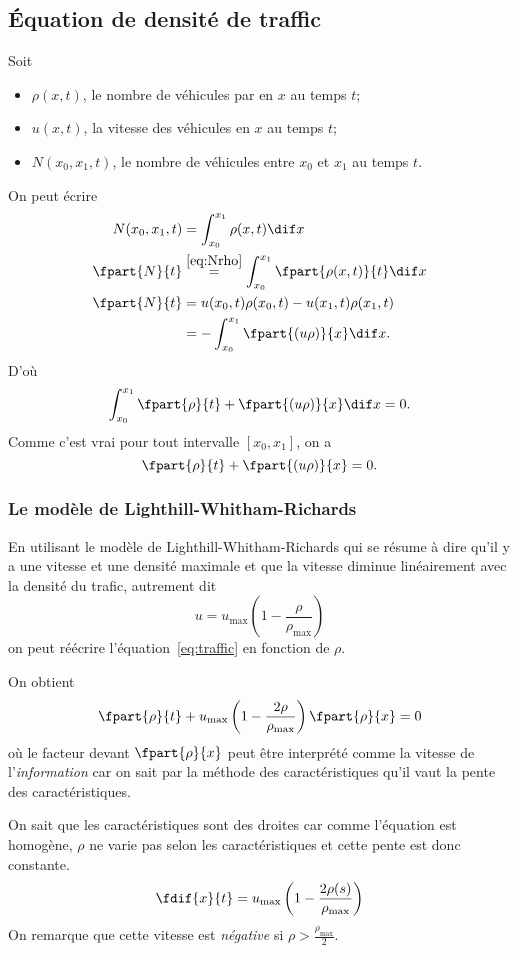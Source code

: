 \subsection{Équation de densité de traffic}
\label{sec:traffic}
Soit
\begin{itemize}
  \item $\rho(x, t)$, le nombre de véhicules par \meter en $x$ au temps $t$;
  \item $u(x, t)$, la vitesse des véhicules en $x$ au temps $t$;
  \item $N(x_0, x_1, t)$, le nombre de véhicules entre $x_0$ et $x_1$
    au temps $t$.
\end{itemize}
On peut écrire
\begin{align}
  \label{eq:Nrho}
  N(x_0, x_1, t) & = \int_{x_0}^{x_1} \rho(x, t) \dif x\\
  \nonumber
  \fpart{N}{t} & \stackrel{\eqref{eq:Nrho}}{=}
  \int_{x_0}^{x_1} \fpart{\rho(x, t)}{t} \dif x\\
  \nonumber
  \fpart{N}{t} & = u(x_0, t) \rho(x_0, t) - u(x_1, t) \rho(x_1, t)\\
  \nonumber
  & = - \int_{x_0}^{x_1} \fpart{(u\rho)}{x} \dif x.
\end{align}
D'où
\[ \int_{x_0}^{x_1} \fpart{\rho}{t} + \fpart{(u\rho)}{x} \dif x = 0. \]
Comme c'est vrai pour tout intervalle $[x_0, x_1]$, on a
\begin{equation}
  \label{eq:traffic}
  \fpart{\rho}{t} + \fpart{(u\rho)}{x} = 0.
\end{equation}

\subsubsection{Le modèle de Lighthill-Whitham-Richards}
En utilisant le modèle de Lighthill-Whitham-Richards qui
se résume à dire qu'il y a une vitesse et une densité maximale
et que la vitesse diminue linéairement avec la densité du trafic,
autrement dit
\[ u = u_\mathrm{max} \left(1 - \frac{\rho}{\rho_\mathrm{max}}\right) \]
on peut réécrire l'équation~\eqref{eq:traffic} en fonction de $\rho$.

On obtient
\[ \fpart{\rho}{t} + u_\mathrm{max}
\left(1 - \frac{2\rho}{\rho_\mathrm{max}}\right)\fpart{\rho}{x} = 0 \]
où le facteur devant $\fpart{\rho}{x}$ peut être interprété comme la vitesse
de l'\emph{information} car on sait par la méthode des caractéristiques
qu'il vaut la pente des caractéristiques.

On sait que les caractéristiques sont des droites car comme l'équation
est homogène, $\rho$ ne varie pas selon les caractéristiques et cette
pente est donc constante.
\[ \fdif{x}{t} =
u_\mathrm{max} \left(1-\frac{2\rho(s)}{\rho_\mathrm{max}}\right) \]
On remarque que cette vitesse est \emph{négative} si
$\rho > \frac{\rho_\mathrm{max}}{2}$.

